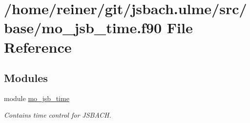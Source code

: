 \hypertarget{mo__jsb__time_8f90}{}\section{/home/reiner/git/jsbach.ulme/src/base/mo\+\_\+jsb\+\_\+time.f90 File Reference}
\label{mo__jsb__time_8f90}
\subsection*{Modules}
\begin{DoxyCompactItemize}
\item 
module \hyperlink{namespacemo__jsb__time}{mo\+\_\+jsb\+\_\+time}
\begin{DoxyCompactList}\small\item\em Contains time control for J\+S\+B\+A\+C\+H. \end{DoxyCompactList}\end{DoxyCompactItemize}
